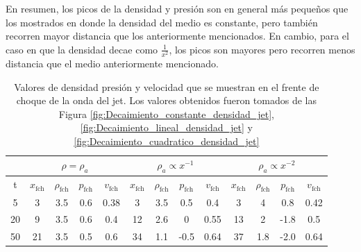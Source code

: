 \documentclass[12pt,a4paper]{book}
\begin{document}
En resumen, los picos de la densidad y presión 
son en general más pequeños que los mostrados en donde la densidad del medio es constante, pero también recorren mayor 
distancia que los anteriormente mencionados. En cambio, para el caso en que la densidad decae como $\frac{1}{x^2}$, los picos son mayores pero recorren menos distancia que el medio anteriormente mencionado.


\begin{table}[htbp]
  \begin{center}
  \begin{tabular}{|c|c|c|c|c|c|c|c|c|c|c|c|c|}
    \hline 
    & \multicolumn{4}{|c|}{$\rho = \rho_a$} & \multicolumn{4}{|c|}{$\rho_a \propto x^{-1}$} & \multicolumn{4}{|c|}{$\rho_a \propto x^{-2}$}\\
    \hline
    t & $x_{\text{fch}}$ & $\rho_{\text{fch}}$ & $p_{\text{fch}}$ & $v_{\text{fch}}$ & $x_{\text{fch}}$ & 
    $\rho_{\text{fch}}$ & $p_{\text{fch}}$ & $v_{\text{fch}}$ & $x_{\text{fch}}$ & $\rho_{\text{fch}}$ & $p_{\text{fch}}$ & 
    $v_{\text{fch}}$ \\
    \hline
     5 & 3  & 3.5 & 0.6 & 0.38    &  3  & 3.5 &  0.5  & 0.4     & 3  & 4   & 0.8  & 0.42 \\
    \hline
    20 & 9  & 3.5 & 0.6 & 0.4    &  12 & 2.6 &   0   & 0.55    & 13 & 2   & -1.8 & 0.5 \\
    \hline
    50 & 21 & 3.5 & 0.5 & 0.6    &  34 & 1.1 & -0.5  & 0.64     & 37 & 1.8 & -2.0 & 0.64 \\
    \hline

  \end{tabular}
  \caption{\label{Cuadro:valores_frente_choque} Valores de densidad presión y velocidad que se muestran en el frente
  de choque de la onda del jet. Los valores obtenidos fueron tomados de las Figura \ref{fig:Decaimiento_constante_densidad_jet},
  \ref{fig:Decaimiento_lineal_densidad_jet} y \ref{fig:Decaimiento_cuadratico_densidad_jet}}
  \end{center}
  \end{table}
\end{document}
